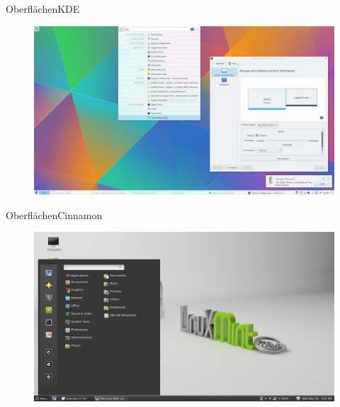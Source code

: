 \begin{frame}{Oberflächen}{KDE}

\begin{figure}
 \includegraphics[height=0.6\textheight]{resources/1200px-Kscreen-krunner.png}
 \end{figure}


\end{frame}

\begin{frame}{Oberflächen}{Cinnamon}
\begin{figure}
 \includegraphics[height=0.6\textheight]{resources/1200px-Linux_Mint.png}
 \end{figure}


\end{frame}


 





